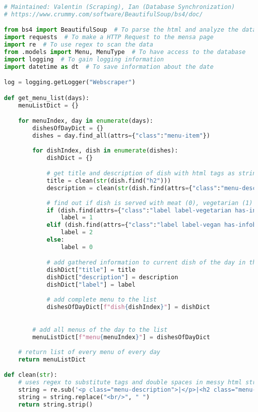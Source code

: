 \begin{lstlisting}[language=Python]
# Maintained: Valentin (Scraping), Ian (Database Synchronization)
# https://www.crummy.com/software/BeautifulSoup/bs4/doc/

from bs4 import BeautifulSoup  # To parse the html and analyze the data
import requests  # To make a HTTP Request to the mensa page
import re  # To use regex to scan the data
from .models import Menu, MenuType  # To have access to the database
import logging  # To gain logging information
import datetime as dt  # To save information about the date

log = logging.getLogger("Webscraper")

def get_menu_list(days):
    menuListDict = {}

    for menuIndex, day in enumerate(days):
        dishesOfDayDict = {}
        dishes = day.find_all(attrs={"class":"menu-item"})
        
        for dishIndex, dish in enumerate(dishes):
            dishDict = {}

            # get title and description of dish with html tags as strings and using the "clean()" function to remove tags and double spaces
            title = clean(str(dish.find("h2")))
            description = clean(str(dish.find(attrs={"class":"menu-description"})))
            
            # find out if dish is served with meat (0), vegetarian (1) or vegan (2)
            if (dish.find(attrs={"class":"label label-vegetarian has-infobox"}) is not None):
                label = 1
            elif (dish.find(attrs={"class":"label label-vegan has-infobox"}) is not None):
                label = 2
            else:
                label = 0

            # add gathered information to current dish of the day in the list
            dishDict["title"] = title
            dishDict["description"] = description
            dishDict["label"] = label
            
            # add complete menu to the list
            dishesOfDayDict[f"dish{dishIndex}"] = dishDict

        
        # add all menus of the day to the list
        menuListDict[f"menu{menuIndex}"] = dishesOfDayDict
    
    # return list of every menu of every day
    return menuListDict

def clean(str):
    # uses regex to substitute tags and double spaces in messy html string with empty strings or single spaces
    string = re.sub('<p class="menu-description">|</p>|<h2 class="menu-title">|</h2>|\\xad\s*|\\n', '', str)
    string = string.replace("<br/>", " ")
    return string.strip()


\end{lstlisting}
